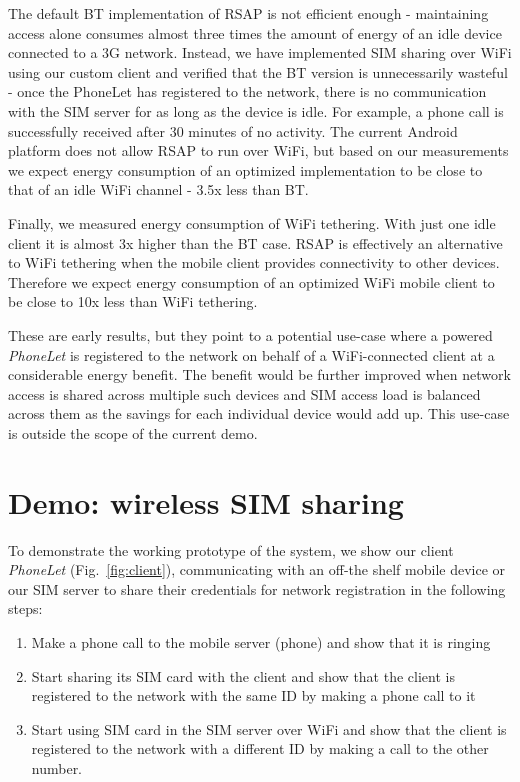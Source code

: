 \documentclass{sig-alternate-2013}
\begin{document}
The default BT implementation of RSAP is not efficient enough - maintaining access alone consumes almost three times the amount of energy of an idle device connected to a 3G network. Instead, we have implemented SIM sharing over WiFi using our custom client and verified that the BT version is unnecessarily wasteful - once the PhoneLet has registered to the network, there is no communication with the SIM server for as long as the device is idle. For example, a phone call is successfully received after 30 minutes of no activity. The current Android platform does not allow RSAP to run over WiFi, but based on our measurements we expect energy consumption of an optimized implementation to be close to that of an idle WiFi channel - 3.5x less than BT.

Finally, we measured energy consumption of WiFi tethering. With just one idle client it is almost 3x higher than the BT case. RSAP is effectively an alternative to WiFi tethering when the mobile client provides connectivity to other devices. Therefore we expect energy consumption of an optimized WiFi mobile client to be close to 10x less than WiFi tethering.

These are early results, but they point to a potential use-case where a powered \emph{PhoneLet} is registered to the network on behalf of a WiFi-connected client at a considerable energy benefit. The benefit would be further improved when network access is shared across multiple such devices and SIM access load is balanced across them as the savings for each individual device would add up. This use-case is outside the scope of the current demo.

\section{Demo: wireless SIM sharing}

To demonstrate the working prototype of the system, we show our client \emph{PhoneLet} (Fig.~\ref{fig:client}), communicating with an off-the shelf mobile device or our SIM server to share their credentials for network registration in the following steps:

\begin{enumerate}
    \item Make a phone call to the mobile server (phone) and show that it is ringing
    \item Start sharing its SIM card with the client and show that the client is registered to the network with the same ID by making a phone call to it
    \item Start using SIM card in the SIM server over WiFi and show that the client is registered to the network with a different ID by making a call to the other number.
\end{enumerate}
\end{document}
